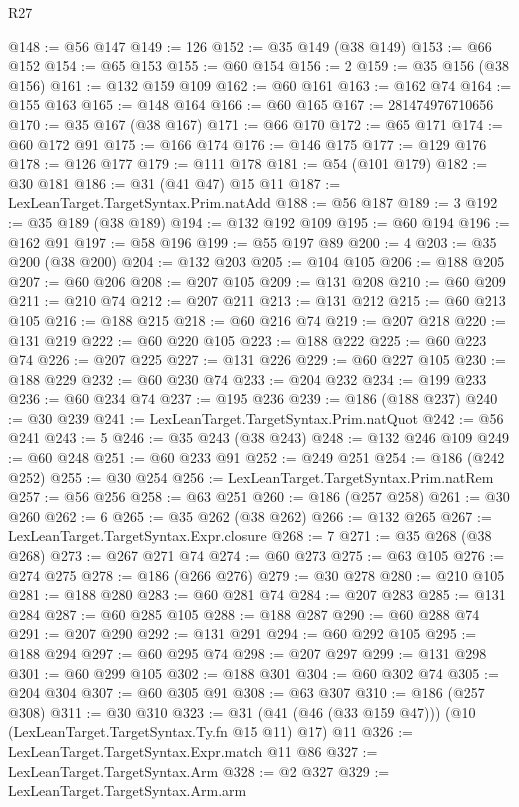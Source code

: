 \begin{lexlean}{R27}
\begin{coremodule}
@148 := @56 @147
@149 := 126
@152 := @35 @149 (@38 @149)
@153 := @66 @152
@154 := @65 @153
@155 := @60 @154
@156 := 2
@159 := @35 @156 (@38 @156)
@161 := @132 @159 @109
@162 := @60 @161
@163 := @162 @74
@164 := @155 @163
@165 := @148 @164
@166 := @60 @165
@167 := 281474976710656
@170 := @35 @167 (@38 @167)
@171 := @66 @170
@172 := @65 @171
@174 := @60 @172 @91
@175 := @166 @174
@176 := @146 @175
@177 := @129 @176
@178 := @126 @177
@179 := @111 @178
@181 := @54 (@101 @179)
@182 := @30 @181
@186 := @31 (@41 @47) @15 @11
@187 := LexLeanTarget.TargetSyntax.Prim.natAdd
@188 := @56 @187
@189 := 3
@192 := @35 @189 (@38 @189)
@194 := @132 @192 @109
@195 := @60 @194
@196 := @162 @91
@197 := @58 @196
@199 := @55 @197 @89
@200 := 4
@203 := @35 @200 (@38 @200)
@204 := @132 @203
@205 := @104 @105
@206 := @188 @205
@207 := @60 @206
@208 := @207 @105
@209 := @131 @208
@210 := @60 @209
@211 := @210 @74
@212 := @207 @211
@213 := @131 @212
@215 := @60 @213 @105
@216 := @188 @215
@218 := @60 @216 @74
@219 := @207 @218
@220 := @131 @219
@222 := @60 @220 @105
@223 := @188 @222
@225 := @60 @223 @74
@226 := @207 @225
@227 := @131 @226
@229 := @60 @227 @105
@230 := @188 @229
@232 := @60 @230 @74
@233 := @204 @232
@234 := @199 @233
@236 := @60 @234 @74
@237 := @195 @236
@239 := @186 (@188 @237)
@240 := @30 @239
@241 := LexLeanTarget.TargetSyntax.Prim.natQuot
@242 := @56 @241
@243 := 5
@246 := @35 @243 (@38 @243)
@248 := @132 @246 @109
@249 := @60 @248
@251 := @60 @233 @91
@252 := @249 @251
@254 := @186 (@242 @252)
@255 := @30 @254
@256 := LexLeanTarget.TargetSyntax.Prim.natRem
@257 := @56 @256
@258 := @63 @251
@260 := @186 (@257 @258)
@261 := @30 @260
@262 := 6
@265 := @35 @262 (@38 @262)
@266 := @132 @265
@267 := LexLeanTarget.TargetSyntax.Expr.closure
@268 := 7
@271 := @35 @268 (@38 @268)
@273 := @267 @271 @74
@274 := @60 @273
@275 := @63 @105
@276 := @274 @275
@278 := @186 (@266 @276)
@279 := @30 @278
@280 := @210 @105
@281 := @188 @280
@283 := @60 @281 @74
@284 := @207 @283
@285 := @131 @284
@287 := @60 @285 @105
@288 := @188 @287
@290 := @60 @288 @74
@291 := @207 @290
@292 := @131 @291
@294 := @60 @292 @105
@295 := @188 @294
@297 := @60 @295 @74
@298 := @207 @297
@299 := @131 @298
@301 := @60 @299 @105
@302 := @188 @301
@304 := @60 @302 @74
@305 := @204 @304
@307 := @60 @305 @91
@308 := @63 @307
@310 := @186 (@257 @308)
@311 := @30 @310
@323 := @31 (@41 (@46 (@33 @159 @47))) (@10 (LexLeanTarget.TargetSyntax.Ty.fn @15 @11) @17) @11
@326 := LexLeanTarget.TargetSyntax.Expr.match @11 @86
@327 := LexLeanTarget.TargetSyntax.Arm
@328 := @2 @327
@329 := LexLeanTarget.TargetSyntax.Arm.arm

\end{coremodule}
\end{lexlean}
